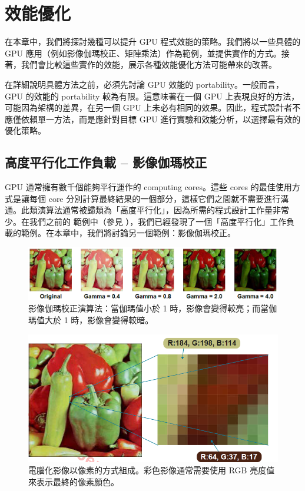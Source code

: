 \chapter{ 效能優化} \label{chap:hip_optimization}
在本章中，我們將探討幾種可以提升 GPU 程式效能的策略。我們將以一些具體的 GPU 應用（例如影像伽瑪校正、矩陣乘法）作為範例，並提供實作的方式。接著，我們會比較這些實作的效能，展示各種效能優化方法可能帶來的改善。

在詳細說明具體方法之前，必須先討論 GPU 效能的 portability。一般而言，GPU 的效能的 portability 較為有限。這意味著在一個 GPU 上表現良好的方法，可能因為架構的差異，在另一個 GPU 上未必有相同的效果。因此，程式設計者不應僅依賴單一方法，而是應針對目標 GPU 進行實驗和效能分析，以選擇最有效的優化策略。

\section{高度平行化工作負載 – 影像伽瑪校正}
\label{sec:gamma_correction}
GPU 通常擁有數千個能夠平行運作的 computing cores。這些 cores 的最佳使用方式是讓每個 core 分別計算最終結果的一個部分，這樣它們之間就不需要進行溝通。此類演算法通常被歸類為「高度平行化」，因為所需的程式設計工作量非常少。在我們之前的  範例中（參見 ），我們已經發現了一個「高度平行化」工作負載的範例。在本章中，我們將討論另一個範例：影像伽瑪校正。

\begin{figure}
    \centering
    \includegraphics[width=1\linewidth]{FileAusiliari/Screenshots/Figure8-1.png}
    \caption{影像伽瑪校正演算法：當伽瑪值小於 1 時，影像會變得較亮；而當伽瑪值大於 1 時，影像會變得較暗。}
    \label{fig:gamma}
\end{figure}

\begin{figure}
    \centering
    \includegraphics[width=0.9\linewidth]{FileAusiliari/Screenshots/Figure8-2.png}
    \caption{電腦化影像以像素的方式組成。彩色影像通常需要使用 RGB 亮度值來表示最終的像素顏色。}
    \label{fig:RGB}
\end{figure}

